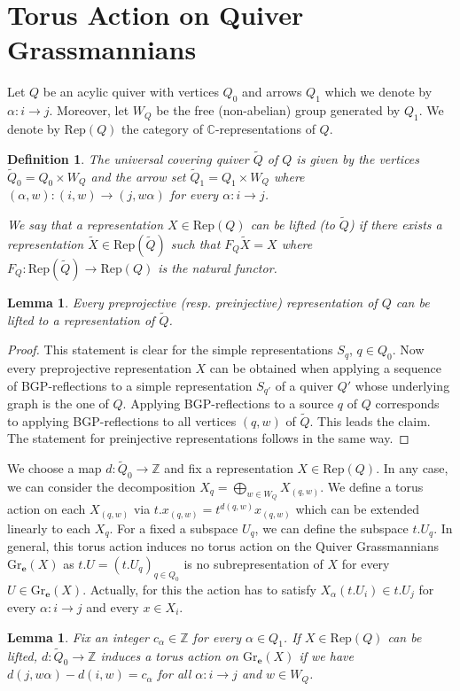 \documentclass{amsart}
\newtheorem{definition}[theorem]{Definition}
\newtheorem{lemma}[theorem]{Lemma}
\newcommand{\bfe}{\mathbf{e}}
\newcommand{\C}{\mathbb{C}}
\newcommand{\Rep}{\mathrm{Rep}}
\newcommand{\Gr}{\mathrm{Gr}}
\newcommand{\ZZ}{\mathbb{Z}}
\begin{document}
\section{Torus Action on Quiver Grassmannians}
\noindent Let $Q$ be an acylic quiver with vertices $Q_0$ and arrows $Q_1$ which we denote by $\alpha:i\to j$. Moreover, let $W_{Q}$ be the free (non-abelian) group generated by $Q_1$.  We denote by $\Rep(Q)$ the category of $\C$-representations of $Q$.
\begin{definition}
The universal covering quiver $\tilde Q$ of $Q$ is given by the vertices $\tilde Q_0=Q_0\times W_{Q}$ and the arrow set $\tilde Q_1=Q_1\times W_{Q}$ where $(\alpha,w):(i,w)\to (j,w\alpha)$ for every $\alpha:i\to j$.

We say that a representation $X\in \Rep(Q)$ can be lifted (to $\tilde Q$) if there exists a representation $\tilde X\in\Rep(\tilde Q)$ such that $F_Q\tilde X=X$ where $F_Q:\Rep(\tilde Q)\to\Rep(Q)$ is the natural functor.
\end{definition}
\begin{lemma}
  Every preprojective (resp. preinjective) representation of $Q$ can be lifted to a representation of $\tilde Q$.
\end{lemma}
\begin{proof}This statement is clear for the simple representations $S_q$, $q\in Q_0$. Now every preprojective representation $X$ can be obtained when applying a sequence of BGP-reflections \cite{bgp} to a simple representation $S_{q'}$ of a quiver $Q'$ whose underlying graph is the one of $Q$. Applying BGP-reflections to a source $q$ of $Q$ corresponds to applying BGP-reflections to all vertices $(q,w)$ of $\tilde Q$. This leads the claim. The statement for preinjective representations follows in the same way.
\end{proof}
We choose a map $d:\tilde Q_0\to\ZZ$ and fix a representation $X\in\Rep(Q)$. In any case, we can consider the decomposition $X_q=\bigoplus_{w\in W_Q} X_{(q,w)}$. We define a torus action on each $X_{(q,w)}$ via $t.x_{(q,w)}=t^{d(q,w)}x_{(q,w)}$ which can be extended linearly to each $X_q$. For a fixed a subspace $U_q$, we can define the subspace $t.U_q$. In general, this torus action induces no torus action on the Quiver Grassmannians $\Gr_{\bfe}(X)$ as $t.U=(t.U_q)_{q\in Q_0}$ is no subrepresentation of $X$ for every $U\in \Gr_{\bfe}(X)$. Actually, for this the action has to satisfy $X_{\alpha}(t.U_i)\in t.U_j$ for every $\alpha:i\to j$ and every $x\in X_i$. 
\begin{lemma}Fix an integer $c_\alpha\in\ZZ$ for every $\alpha\in Q_1$.
If $X\in\Rep(Q)$ can be lifted, $d:\tilde Q_0\to\ZZ$ induces a torus action on $\Gr_\bfe(X)$ if we have $d(j,w\alpha)-d(i,w)=c_\alpha$ for all $\alpha:i\to j$ and $w\in W_{Q}$.
\end{lemma}
\end{document}
